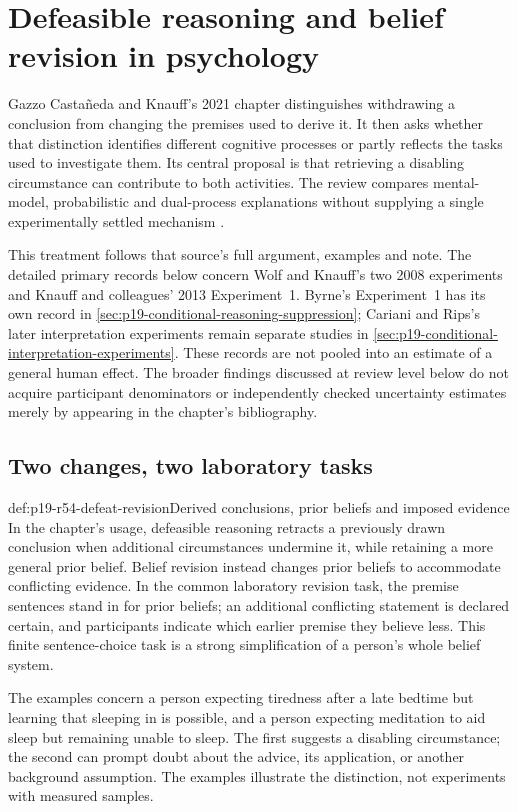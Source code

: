 \chapter{Defeasible reasoning and belief revision in psychology}
\label{sec:p19-rationality-5-4}

Gazzo Castañeda and Knauff's 2021 chapter distinguishes withdrawing a
conclusion from changing the premises used to derive it. It then asks
whether that distinction identifies different cognitive processes or partly
reflects the tasks used to investigate them. Its central proposal is that
retrieving a disabling circumstance can contribute to both activities.
The review compares mental-model, probabilistic and dual-process explanations
without supplying a single experimentally settled mechanism
\cite[pp.~347--359]{GazzoCastanedaKnauff2021Defeasible}.

This treatment follows that source's full argument, examples and note.
The detailed primary records below concern Wolf and Knauff's two 2008
experiments and Knauff and colleagues' 2013 Experiment~1. Byrne's
Experiment~1 has its own record in
\cref{sec:p19-conditional-reasoning-suppression}; Cariani and Rips's later
interpretation experiments remain separate studies in
\cref{sec:p19-conditional-interpretation-experiments}.
These records are not pooled into an estimate of a general human effect.
The broader findings discussed at review level below do not acquire
participant denominators or independently checked uncertainty estimates
merely by appearing in the chapter's bibliography.

\section{Two changes, two laboratory tasks}
\label{sec:p19-r54-two-tasks}

\begin{hbdefinition}{def:p19-r54-defeat-revision}{Derived conclusions, prior beliefs and imposed evidence}
In the chapter's usage, defeasible reasoning retracts a previously drawn
conclusion when additional circumstances undermine it, while retaining a
more general prior belief. Belief revision instead changes prior beliefs
to accommodate conflicting evidence. In the common laboratory revision
task, the premise sentences stand in for prior beliefs; an additional
conflicting statement is declared certain, and participants indicate which
earlier premise they believe less. This finite sentence-choice task is a
strong simplification of a person's whole belief system.

The examples concern a person expecting tiredness after a late bedtime
but learning that sleeping in is possible, and a person expecting meditation
to aid sleep but remaining unable to sleep. The first suggests a disabling
circumstance; the second can prompt doubt about the advice, its application,
or another background assumption. The examples illustrate the distinction,
not experiments with measured samples.
\end{hbdefinition}

